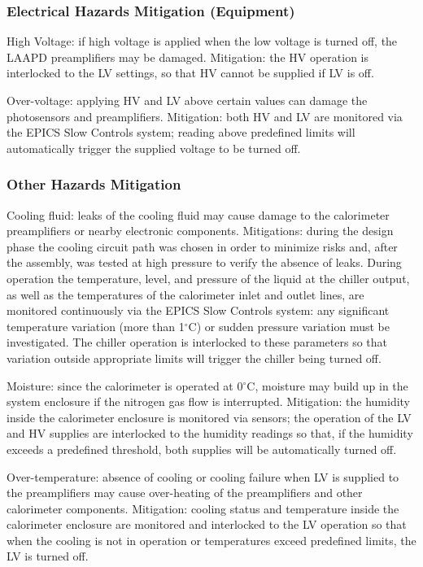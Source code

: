 \subsubsection{Electrical Hazards Mitigation (Equipment)}

High Voltage: if high voltage is applied when the low voltage is turned off, the LAAPD 
preamplifiers may be damaged. Mitigation: the HV operation is interlocked to the LV settings, 
so that HV cannot be supplied if LV is off.

Over-voltage: applying HV and LV above certain values can damage the photosensors and 
preamplifiers. Mitigation: both HV and LV are monitored via the EPICS Slow Controls system; 
reading above predefined limits will automatically trigger the supplied voltage to be turned 
off.

\subsubsection{Other Hazards Mitigation}

Cooling fluid: leaks of the cooling fluid may cause damage to the calorimeter preamplifiers 
or nearby electronic components. Mitigations: during the design phase the cooling circuit 
path was chosen in order to minimize risks and, after the assembly, was tested at high 
pressure to verify the absence of leaks. During operation the temperature, level, and pressure 
of the liquid at the chiller output, as well as the temperatures of the calorimeter inlet and 
outlet lines, are monitored continuously via the EPICS Slow Controls system: any significant 
temperature variation (more than 1$^{\circ}$C) or sudden pressure variation must be investigated. 
The chiller operation is interlocked to these parameters so that variation outside appropriate 
limits will trigger the chiller being turned off.

Moisture: since the calorimeter is operated at 0$^{\circ}$C, moisture may build up in the 
system enclosure if the nitrogen gas flow is interrupted. Mitigation: the humidity inside the 
calorimeter enclosure is monitored via sensors; the operation of the LV and HV supplies are 
interlocked to the humidity readings so that, if the humidity exceeds a predefined threshold, 
both supplies will be automatically turned off.

Over-temperature: absence of cooling or cooling failure when LV is supplied to the preamplifiers 
may cause over-heating of the preamplifiers and other calorimeter components. Mitigation: cooling 
status and temperature inside the calorimeter enclosure are monitored and interlocked to the LV 
operation so that when the cooling is not in operation or temperatures exceed predefined limits, 
the LV is turned off.

